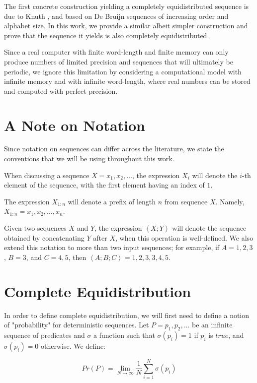 \documentclass[11pt,a4paper]{tesis}
\theoremstyle{plain}
\theoremstyle{definition}
\begin{document}
The first concrete construction yielding a completely equidistributed sequence is due to Knuth \cite{knuth-1965}, and based on De Bruijn sequences of increasing order and alphabet size. In this work, we provide a similar albeit simpler construction and prove that the sequence it yields is also completely equidistributed.

Since a real computer with finite word-length and finite memory can only produce numbers of limited precision and sequences that will ultimately be periodic, we ignore this limitation by considering a computational model with infinite memory and with infinite word-length, where real numbers can be stored and computed with perfect precision.

\section{A Note on Notation}

Since notation on sequences can differ across the literature, we state the conventions that we will be using throughout this work.

When discussing a sequence $X = x_1, x_2, \dots$, the expression $X_i$ will denote the $i$-th element of the sequence, with the first element having an index of $1$.

The expression $X_{1 : n}$ will denote a prefix of length $n$ from sequence $X$. Namely, $X_{1 : n} = x_1, x_2, \dots, x_n$.

Given two sequences $X$ and $Y$, the expression $ \left< X ; Y \right>$ will denote the sequence obtained by concatenating $Y$ after $X$, when this operation is well-defined. We also extend this notation to more than two input sequences; for example, if $A = 1, 2, 3$, $B = 3$, and $C = 4, 5$, then $\left< A ; B ; C \right> = 1, 2, 3, 3, 4, 5$.

\section{Complete Equidistribution}

In order to define complete equidistribution, we will first need to define a notion of "probability" for deterministic sequences. Let $P = p_1, p_2, ...$ be an infinite sequence of predicates and $\sigma$ a function such that $\sigma(p_i) = 1$ if $p_i$ is $true$, and $\sigma(p_i) = 0$ otherwise. We define:

\begin{equation*}
  Pr(P) = \lim_{N \to \infty} \frac{1}{N} \sum_{i = 1}^{N} \sigma(p_i)
\end{equation*}
\end{document}
